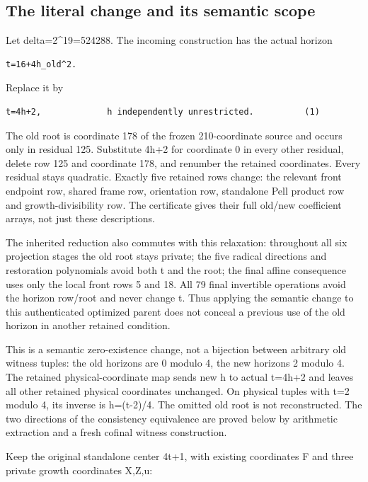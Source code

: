 \subsection{The literal change and its semantic
scope}\label{the-literal-change-and-its-semantic-scope}

Let delta=2\^{}19=524288. The incoming construction has the actual
horizon

\begin{verbatim}
t=16+4h_old^2.
\end{verbatim}

Replace it by

\begin{verbatim}
t=4h+2,             h independently unrestricted.          (1)
\end{verbatim}

The old root is coordinate 178 of the frozen 210-coordinate source and
occurs only in residual 125. Substitute 4h+2 for coordinate 0 in every
other residual, delete row 125 and coordinate 178, and renumber the
retained coordinates. Every residual stays quadratic. Exactly five
retained rows change: the relevant front endpoint row, shared frame row,
orientation row, standalone Pell product row and growth-divisibility
row. The certificate gives their full old/new coefficient arrays, not
just these descriptions.

The inherited reduction also commutes with this relaxation: throughout
all six projection stages the old root stays private; the five radical
directions and restoration polynomials avoid both t and the root; the
final affine consequence uses only the local front rows 5 and 18. All 79
final invertible operations avoid the horizon row/root and never change
t. Thus applying the semantic change to this authenticated optimized
parent does not conceal a previous use of the old horizon in another
retained condition.

This is a semantic zero-existence change, not a bijection between
arbitrary old witness tuples: the old horizons are 0 modulo 4, the new
horizons 2 modulo 4. The retained physical-coordinate map sends new h to
actual t=4h+2 and leaves all other retained physical coordinates
unchanged. On physical tuples with t=2 modulo 4, its inverse is
h=(t-2)/4. The omitted old root is not reconstructed. The two directions
of the consistency equivalence are proved below by arithmetic extraction
and a fresh cofinal witness construction.

Keep the original standalone center 4t+1, with existing coordinates F
and three private growth coordinates X,Z,u:

